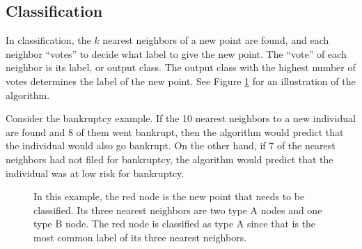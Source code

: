 \subsection*{Classification}
In classification, the $k$ nearest neighbors of a new point are found, and each neighbor ``votes'' to decide what label to give the new point. The ``vote'' of each neighbor is its label, or output class. The output class with the highest number of votes determines the label of the new point. See Figure \ref{fig:knn} for an illustration of the algorithm.

Consider the bankruptcy example.
If the 10 nearest neighbors to a new individual are found and 8 of them went bankrupt, then the algorithm would predict that the individual would also go bankrupt.
On the other hand, if 7 of the nearest neighbors had not filed for bankruptcy, the algorithm would predict that the individual was at low risk for bankruptcy.

\begin{figure}[h]
\begin{center}
\caption{In this example, the red node is the new point that needs to be classified. Its three nearest neighbors are two type A nodes and one type B node. The red node is classified as type A since that is the most common label of its three nearest neighbors.}
\label{fig:knn}
\end{center}
\end{figure}

